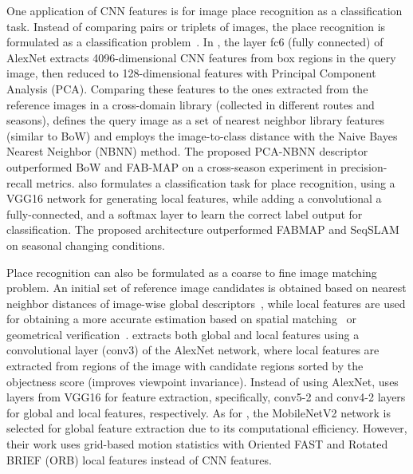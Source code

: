One application of CNN features is for image place recognition as a classification task. Instead of comparing pairs or triplets of images, the place recognition is formulated as a classification problem~\parencite{chen-et-al:2018:2859916}.
In \cite{taisho-kanji:2016:7866383}, the layer fc6 (fully connected) of AlexNet extracts 4096-dimensional CNN features from box regions in the query image, then reduced to 128-dimensional features with Principal Component Analysis (PCA). Comparing these features to the ones extracted from the reference images in a cross-domain library (collected in different routes and seasons), \cite{taisho-kanji:2016:7866383} defines the query image as a set of nearest neighbor library features (similar to BoW) and employs the image-to-class distance with the Naive Bayes Nearest Neighbor (NBNN) method. The proposed PCA-NBNN descriptor outperformed BoW and FAB-MAP on a cross-season experiment in precision-recall metrics.
\cite{chen-et-al:2018:2859916} also formulates a classification task for place recognition, using a VGG16 network for generating local features, while adding a convolutional a fully-connected, and a softmax layer to learn the correct label output for classification. The proposed architecture outperformed FABMAP and SeqSLAM on seasonal changing conditions.

Place recognition can also be formulated as a coarse to fine image matching problem. An initial set of reference image candidates is obtained based on nearest neighbor distances of image-wise global descriptors~\parencite{xin-et-al:2017:8310121,camara-et-al:2020:9196967,liu-et-al:2021:9561126}, while local features are used for obtaining a more accurate estimation based on spatial matching~\parencite{xin-et-al:2017:8310121,camara-et-al:2020:9196967} or geometrical verification~\parencite{liu-et-al:2021:9561126}.
\cite{xin-et-al:2017:8310121} extracts both global and local features using a convolutional layer (conv3) of the AlexNet network, where local features are extracted from regions of the image with candidate regions sorted by the objectness score (improves viewpoint invariance).
Instead of using AlexNet, \cite{camara-et-al:2020:9196967} uses layers from VGG16 for feature extraction, specifically, conv5-2 and conv4-2 layers for global and local features, respectively.
As for \cite{liu-et-al:2021:9561126}, the MobileNetV2 network is selected for global feature extraction due to its computational efficiency. However, their work uses grid-based motion statistics with Oriented FAST and Rotated BRIEF (ORB) local features instead of CNN features.

